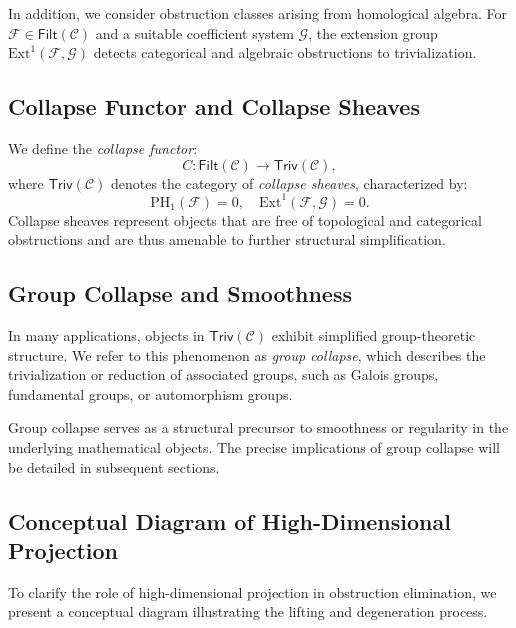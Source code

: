 \documentclass[11pt]{article}
\begin{document}
In addition, we consider obstruction classes arising from homological algebra. For $\mathcal{F} \in \mathsf{Filt}(\mathcal{C})$ and a suitable coefficient system $\mathcal{G}$, the extension group $\mathrm{Ext}^1(\mathcal{F}, \mathcal{G})$ detects categorical and algebraic obstructions to trivialization.

\subsection{Collapse Functor and Collapse Sheaves}

We define the \emph{collapse functor}:
\[
C : \mathsf{Filt}(\mathcal{C}) \longrightarrow \mathsf{Triv}(\mathcal{C}),
\]
where $\mathsf{Triv}(\mathcal{C})$ denotes the category of \emph{collapse sheaves}, characterized by:
\[
\mathrm{PH}_1(\mathcal{F}) = 0, \quad \mathrm{Ext}^1(\mathcal{F}, \mathcal{G}) = 0.
\]
Collapse sheaves represent objects that are free of topological and categorical obstructions and are thus amenable to further structural simplification.

\subsection{Group Collapse and Smoothness}

In many applications, objects in $\mathsf{Triv}(\mathcal{C})$ exhibit simplified group-theoretic structure. We refer to this phenomenon as \emph{group collapse}, which describes the trivialization or reduction of associated groups, such as Galois groups, fundamental groups, or automorphism groups.

Group collapse serves as a structural precursor to smoothness or regularity in the underlying mathematical objects. The precise implications of group collapse will be detailed in subsequent sections.

\subsection{Conceptual Diagram of High-Dimensional Projection}

To clarify the role of high-dimensional projection in obstruction elimination, we present a conceptual diagram illustrating the lifting and degeneration process.
\end{document}
